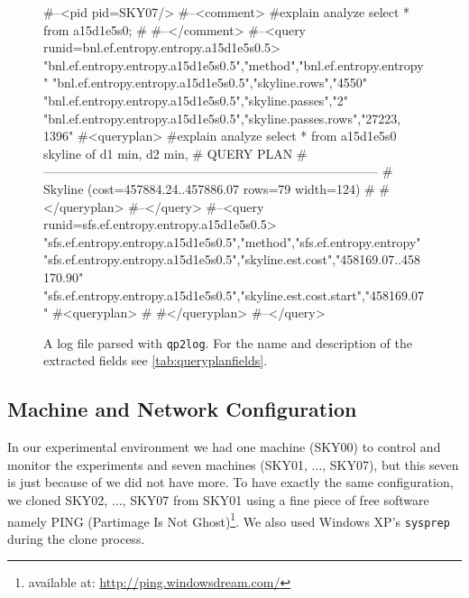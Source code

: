 \begin{figure}[htbp]
\begin{interactive}
#--<pid pid=SKY07/>
#--<comment>
#explain analyze select * from a15d1e5s0;
# \ellipsis{}
#--</comment>
#--<query runid=bnl.ef.entropy.entropy.a15d1e5s0.5>\commentskip
{}
"bnl.ef.entropy.entropy.a15d1e5s0.5","method","bnl.ef.entropy.entropy"
\ellipsis
"bnl.ef.entropy.entropy.a15d1e5s0.5","skyline.rows","4550"
"bnl.ef.entropy.entropy.a15d1e5s0.5","skyline.passes","2"
"bnl.ef.entropy.entropy.a15d1e5s0.5","skyline.passes.rows","27223, 1396"
\ellipsis\commentskip
{}
#<queryplan>
#explain analyze select * from a15d1e5s0 skyline of d1 min, d2 min, \ellipsis
#                                    QUERY PLAN
#--------------------------------------------------------------------------------
# Skyline  (cost=457884.24..457886.07 rows=79 width=124)
# \ellipsis{}
#</queryplan>
#--</query>
#--<query runid=sfs.ef.entropy.entropy.a15d1e5s0.5>
"sfs.ef.entropy.entropy.a15d1e5s0.5","method","sfs.ef.entropy.entropy"
"sfs.ef.entropy.entropy.a15d1e5s0.5","skyline.est.cost","458169.07..458170.90"
"sfs.ef.entropy.entropy.a15d1e5s0.5","skyline.est.cost.start","458169.07"
\ellipsis{}
#<queryplan>
# \ellipsis{}
#</queryplan>
#--</query>
\end{interactive}
\caption{A log file parsed with \texttt{qp2log}.  For the name and description of the extracted fields see \autoref{tab:queryplanfields}.}
\label{fig:parsedlogfile}
\end{figure}

\subsection{Machine and Network Configuration}
In our experimental environment we had one machine (SKY00) to control
and monitor the experiments and seven machines (SKY01, $\ldots$,
SKY07), but this seven is just because of we did not have more.
%
To have exactly the same configuration, we cloned SKY02, $\ldots$, SKY07 from
SKY01 using a fine piece of free software namely PING (Partimage Is
Not Ghost)\footnote{available at: \url{http://ping.windowsdream.com/}}.
We also used Windows XP's \texttt{sysprep} during the clone process.

